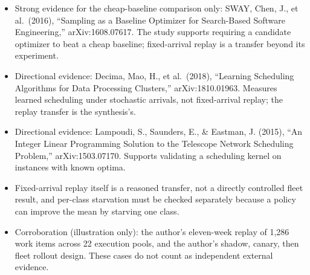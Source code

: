 \begin{itemize}
\tightlist
\item
  Strong evidence for the cheap-baseline comparison only: SWAY, Chen, J., et al.~(2016), ``Sampling as a Baseline Optimizer for Search-Based Software Engineering,'' arXiv:1608.07617. The study supports requiring a candidate optimizer to beat a cheap baseline; fixed-arrival replay is a transfer beyond its experiment.
\item
  Directional evidence: Decima, Mao, H., et al.~(2018), ``Learning Scheduling Algorithms for Data Processing Clusters,'' arXiv:1810.01963. Measures learned scheduling under stochastic arrivals, not fixed-arrival replay; the replay transfer is the synthesis's.
\item
  Directional evidence: Lampoudi, S., Saunders, E., \& Eastman, J. (2015), ``An Integer Linear Programming Solution to the Telescope Network Scheduling Problem,'' arXiv:1503.07170. Supports validating a scheduling kernel on instances with known optima.
\item
  Fixed-arrival replay itself is a reasoned transfer, not a directly controlled fleet result, and per-class starvation must be checked separately because a policy can improve the mean by starving one class.
\item
  Corroboration (illustration only): the author's eleven-week replay of 1,286 work items across 22 execution pools, and the author's shadow, canary, then fleet rollout design. These cases do not count as independent external evidence.
\end{itemize}
